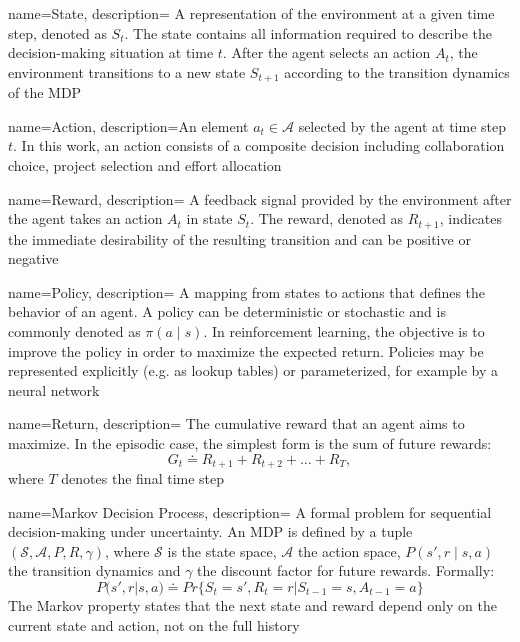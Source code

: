 {
    name={State},
    description={
    A representation of the environment at a given time step, denoted as $S_t$. 
    The state contains all information required to describe the decision-making 
    situation at time $t$. After the agent selects an action $A_t$, 
    the environment transitions to a new state $S_{t+1}$ according to 
    the transition dynamics of the MDP \cite{sutton2018reinforcement}
    }
}

{
    name={Action},
    description={An element $a_{t}\in\mathcal{A}$ selected by the agent at time step $t$. In this work, an action consists of a composite decision including collaboration choice, project selection and effort allocation}
}

{
    name={Reward},
    description={
    A feedback signal provided by the environment after the agent 
    takes an action $A_t$ in state $S_t$. The reward, denoted as $R_{t+1}$, 
    indicates the immediate desirability of the resulting transition and 
    can be positive or negative \cite{sutton2018reinforcement}
    }
}

{
    name={Policy},
    description={
    A mapping from states to actions that defines the behavior of an agent. 
    A policy can be deterministic or stochastic and is commonly denoted as 
    $\pi(a \mid s)$. In reinforcement learning, the objective is to improve 
    the policy in order to maximize the expected return. 
    Policies may be represented explicitly (e.g. as lookup tables) or 
    parameterized, for example by a neural network \cite{sutton2018reinforcement}
    }
}

{
    name={Return},
    description={
    The cumulative reward that an agent aims to maximize. 
    In the episodic case, the simplest form is the sum of future rewards:
    \[
    G_t \doteq R_{t+1} + R_{t+2} + \dots + R_T,
    \]
    where $T$ denotes the final time step \cite{sutton2018reinforcement}
    }
}

{
    name={Markov Decision Process},
    description={
    A formal problem for sequential decision-making under uncertainty. 
    An MDP is defined by a tuple $(\mathcal{S}, \mathcal{A}, P, R, \gamma)$, 
    where $\mathcal{S}$ is the state space, $\mathcal{A}$ the action space, $P(s', r \mid s,a)$ the transition dynamics and $\gamma$ the discount factor for future rewards. Formally:
    $$P(s', r|s,a)\doteq Pr\{S_{t}=s', R_t=r|S_{t-1}=s, A_{t-1}=a\}$$
    The Markov property states that the next state and reward depend only on the current state and action, not on the full history \cite{sutton2018reinforcement} 
    }
}

